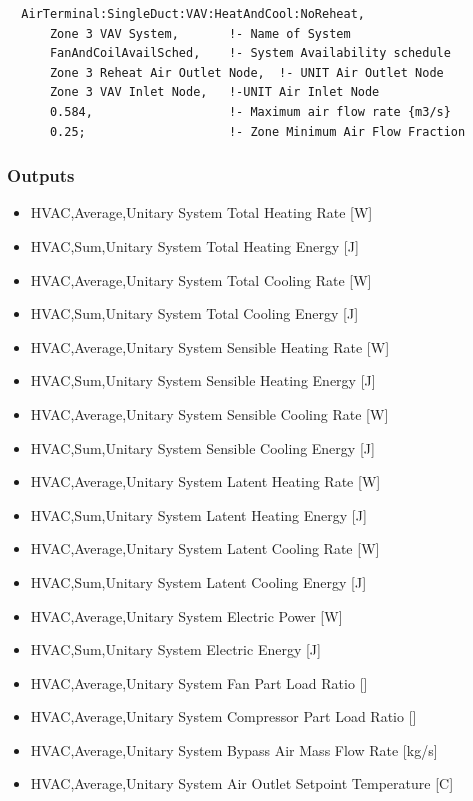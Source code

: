 \begin{lstlisting}
  AirTerminal:SingleDuct:VAV:HeatAndCool:NoReheat,
      Zone 3 VAV System,       !- Name of System
      FanAndCoilAvailSched,    !- System Availability schedule
      Zone 3 Reheat Air Outlet Node,  !- UNIT Air Outlet Node
      Zone 3 VAV Inlet Node,   !-UNIT Air Inlet Node
      0.584,                   !- Maximum air flow rate {m3/s}
      0.25;                    !- Zone Minimum Air Flow Fraction
\end{lstlisting}

\subsubsection{Outputs}\label{outputs-7-011}

\begin{itemize}
\item
  HVAC,Average,Unitary System Total Heating Rate {[}W{]}
\item
  HVAC,Sum,Unitary System Total Heating Energy {[}J{]}
\item
  HVAC,Average,Unitary System Total Cooling Rate {[}W{]}
\item
  HVAC,Sum,Unitary System Total Cooling Energy {[}J{]}
\item
  HVAC,Average,Unitary System Sensible Heating Rate {[}W{]}
\item
  HVAC,Sum,Unitary System Sensible Heating Energy {[}J{]}
\item
  HVAC,Average,Unitary System Sensible Cooling Rate {[}W{]}
\item
  HVAC,Sum,Unitary System Sensible Cooling Energy {[}J{]}
\item
  HVAC,Average,Unitary System Latent Heating Rate {[}W{]}
\item
  HVAC,Sum,Unitary System Latent Heating Energy {[}J{]}
\item
  HVAC,Average,Unitary System Latent Cooling Rate {[}W{]}
\item
  HVAC,Sum,Unitary System Latent Cooling Energy {[}J{]}
\item
  HVAC,Average,Unitary System Electric Power {[}W{]}
\item
  HVAC,Sum,Unitary System Electric Energy {[}J{]}
\item
  HVAC,Average,Unitary System Fan Part Load Ratio {[]}
\item
  HVAC,Average,Unitary System Compressor Part Load Ratio {[]}
\item
  HVAC,Average,Unitary System Bypass Air Mass Flow Rate {[}kg/s{]}
\item
  HVAC,Average,Unitary System Air Outlet Setpoint Temperature {[}C{]}
\end{itemize}

